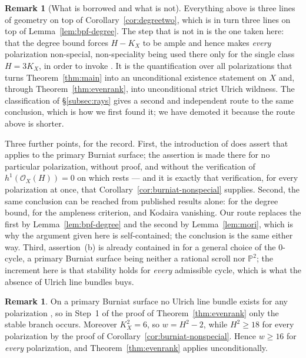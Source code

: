 \documentclass{amsart}
\theoremstyle{definition}
\newtheorem{remark}[theorem]{Remark}
\newcommand{\OO}{\mathcal{O}}
\newcommand{\PP}{\mathbb{P}}
\begin{document}
\begin{remark}[What is borrowed and what is not]\label{rem:cho-nonspecial}
Everything above is three lines of geometry on top of Corollary~\ref{cor:degreetwo}, which is in turn three lines on top of Lemma~\ref{lem:bpf-degree}. The step that is not in \cite{Cho26} is the one taken here: that the degree bound forces $H-K_X$ to be ample and hence makes \emph{every} polarization non-special, non-speciality being used there only for the single class $H=3K_X$, in order to invoke \cite{Cas17}. It is the quantification over all polarizations that turns Theorem~\ref{thm:main} into an unconditional existence statement on $X$ and, through Theorem~\ref{thm:evenrank}, into unconditional strict Ulrich wildness. The classification of \S\ref{subsec:rays} gives a second and independent route to the same conclusion, which is how we first found it; we have demoted it because the route above is shorter.

Three further points, for the record. First, the introduction of \cite{Cho26} does assert that \cite{Cas17} applies to the primary Burniat surface; the assertion is made there for no particular polarization, without proof, and without the verification of $h^1(\OO_X(H))=0$ on which \cite{Cas17} rests --- and it is exactly that verification, for every polarization at once, that Corollary~\ref{cor:burniat-nonspecial} supplies. Second, the same conclusion can be reached from published results alone: \cite[Prop.~5.4]{Cho26} for the degree bound, \cite[Prop.~4.2]{Cho26} for the ampleness criterion, and Kodaira vanishing. Our route replaces the first by Lemma~\ref{lem:bpf-degree} and the second by Lemma~\ref{lem:mori}, which is why the argument given here is self-contained; the conclusion is the same either way. Third, assertion~(b) is already contained in \cite[Thm.~1.2]{Cas17} for a general choice of the $0$-cycle, a primary Burniat surface being neither a rational scroll nor $\PP^2$; the increment here is that stability holds for \emph{every} admissible cycle, which is what the absence of Ulrich line bundles buys.
\end{remark}

\begin{remark}\label{rem:wild-burniat}
On a primary Burniat surface no Ulrich line bundle exists for any polarization \cite[Thm.~5.5]{Cho26}, so in Step~1 of the proof of Theorem~\ref{thm:evenrank} only the stable branch occurs. Moreover $K_X^2=6$, so $w=H^2-2$, while $H^2\ge18$ for every polarization by the proof of Corollary~\ref{cor:burniat-nonspecial}. Hence $w\ge16$ for \emph{every} polarization, and Theorem~\ref{thm:evenrank} applies unconditionally.
\end{remark}
\end{document}
